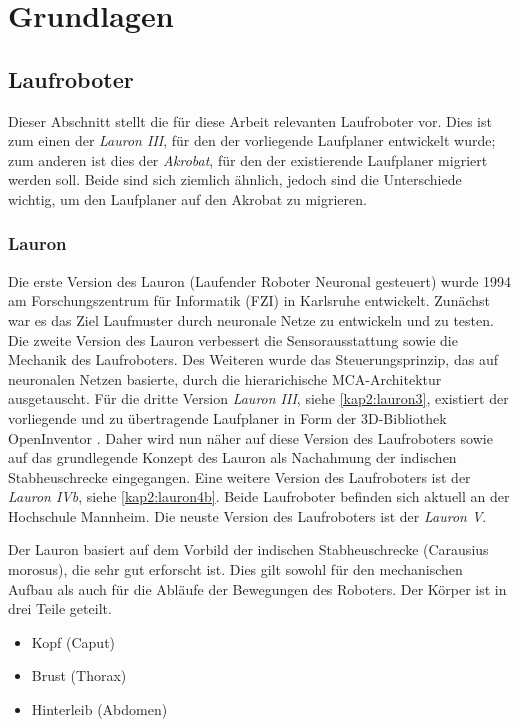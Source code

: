 \chapter{Grundlagen}
\label{kap2}

\section{Laufroboter}

Dieser Abschnitt stellt die für diese Arbeit relevanten Laufroboter vor. Dies ist zum einen der \emph{Lauron III}, für den der vorliegende Laufplaner entwickelt wurde; zum anderen ist dies der \emph{Akrobat}, für den der existierende Laufplaner migriert werden soll. Beide sind sich ziemlich ähnlich, jedoch sind die Unterschiede wichtig, um den Laufplaner auf den Akrobat zu migrieren. 

\subsection{Lauron}

Die erste Version des Lauron (Laufender Roboter Neuronal gesteuert) wurde 1994 am Forschungszentrum für Informatik (FZI) in Karlsruhe \autocite{fzi} entwickelt. Zunächst war es das Ziel Laufmuster durch neuronale Netze zu entwickeln und zu testen. Die zweite Version des Lauron verbessert die Sensorausstattung sowie die Mechanik des Laufroboters. Des Weiteren wurde das Steuerungsprinzip, das auf neuronalen Netzen basierte, durch die hierarichische MCA-Architektur \autocite{scholl2001modular} ausgetauscht. Für die dritte Version \emph{Lauron III}, siehe \autoref{kap2:lauron3}, existiert der vorliegende und zu übertragende Laufplaner in Form der 3D-Bibliothek OpenInventor \autocite{inventor}. Daher wird nun näher auf diese Version des Laufroboters sowie auf das grundlegende Konzept des Lauron als Nachahmung der indischen Stabheuschrecke eingegangen. Eine weitere Version des Laufroboters ist der \emph{Lauron IVb}, siehe \autoref{kap2:lauron4b}. Beide Laufroboter befinden sich aktuell an der Hochschule Mannheim. Die neuste Version des Laufroboters ist der \emph{Lauron V}.

Der Lauron basiert auf dem Vorbild der indischen Stabheuschrecke (Carausius morosus), die sehr gut erforscht ist. Dies gilt sowohl für den mechanischen Aufbau als auch für die Abläufe der Bewegungen des Roboters. Der Körper ist in drei Teile geteilt.
\begin{itemize}
  \item Kopf (Caput)
  \item Brust (Thorax)
  \item Hinterleib (Abdomen)
\end{itemize}

